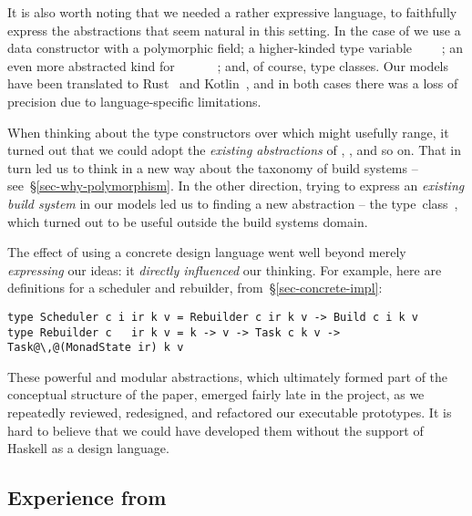 It is also worth noting that we needed a rather expressive language,
to faithfully express the abstractions that seem natural in this
setting.  In the case of  we use a data constructor with a
polymorphic field; a higher-kinded type variable ~\hs{::}~\hs{*}~\hs{->}~\hs{*}; an
even more abstracted kind for ~\hs{::}~\hs{(*}~\hs{->}~\hs{*)}~\hs{->}~; and,
of course, type classes. Our models have been translated to
Rust~\cite{translation_rust} and Kotlin~\cite{translation_kotlin}, and in both
cases there was a loss of precision due to language-specific limitations.

When thinking about the type constructors over which  might usefully
range, it turned out that we could adopt the \emph{existing abstractions}
of , ,  and so on.
That in turn led us to think in a new way about the taxonomy
of build systems -- see~\S\ref{sec-why-polymorphism}. In the other direction,
trying to express an \emph{existing build system} \Dune in our models led us to
finding a new abstraction -- the  \mbox{type
class~\cite{mokhov_selective_2019}}, which turned out to be useful outside the
build systems domain.

The effect of using a concrete design language went well beyond
merely \emph{expressing} our ideas: it \emph{directly influenced}
our thinking.  For example, here are definitions for a scheduler and rebuilder,
from~\S\ref{sec-concrete-impl}:

\vspace{0.5mm}
\begin{verbatim}
type Scheduler c i ir k v = Rebuilder c ir k v -> Build c i k v
type Rebuilder c   ir k v = k -> v -> Task c k v -> Task@\,@(MonadState ir) k v
\end{verbatim}
\vspace{0.5mm}

These powerful and modular abstractions, which ultimately formed part
of the conceptual structure of the paper, emerged fairly late in the
project, as we repeatedly reviewed, redesigned, and refactored our
executable prototypes. It is hard to believe that we could have
developed them without the support of Haskell as a design language.

\subsection{Experience from \Shake}\label{sec-experience-shake}

